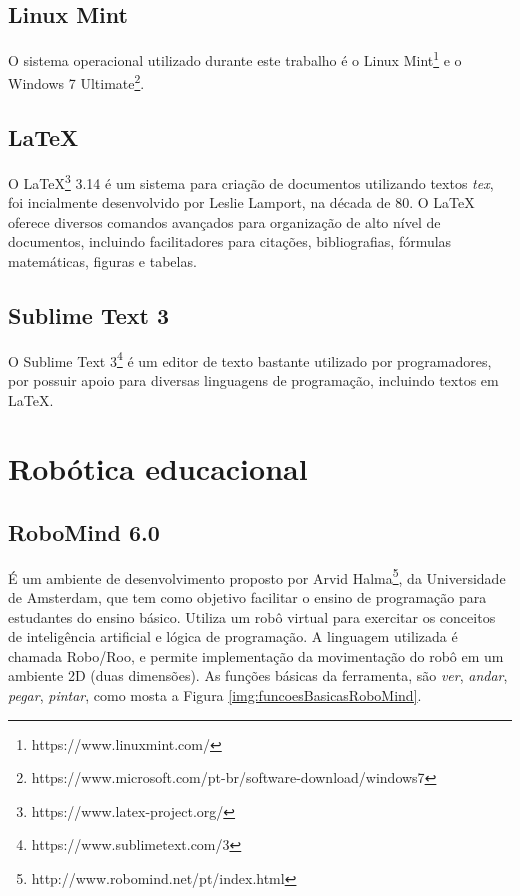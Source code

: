 	\subsection{Linux Mint} %
	\label{sub:linux_mint}
		O sistema operacional utilizado durante este trabalho é o Linux Mint\footnote{https://www.linuxmint.com/} e o Windows 7 Ultimate\footnote{https://www.microsoft.com/pt-br/software-download/windows7}.

	\subsection{LaTeX} %
	\label{sub:latex}
	
	O LaTeX\footnote{https://www.latex-project.org/} 3.14 é um sistema para criação de documentos utilizando textos \textit{tex}, foi incialmente desenvolvido por Leslie Lamport, na década de 80. O LaTeX oferece diversos comandos avançados para organização de alto nível de documentos, incluindo facilitadores para citações, bibliografias, fórmulas matemáticas, figuras e tabelas.

	\subsection{Sublime Text 3} %
	\label{sub:sublime_text_3}
		O Sublime Text 3\footnote{https://www.sublimetext.com/3} é um editor de texto bastante utilizado por programadores, por possuir apoio para diversas linguagens de programação, incluindo textos em LaTeX.

\section{Robótica educacional} %
\label{sec:robótica_educacional_suporte}

	\subsection{RoboMind 6.0} %
	\label{sub:robomind}

		É um ambiente de desenvolvimento proposto por Arvid Halma\footnote{http://www.robomind.net/pt/index.html}, da Universidade de Amsterdam, que tem como objetivo facilitar o ensino de programação para estudantes do ensino básico. Utiliza um robô virtual para exercitar os conceitos de inteligência artificial e lógica de programação. A linguagem utilizada é chamada Robo/Roo, e permite implementação da movimentação do robô em um ambiente 2D (duas dimensões). As funções básicas da ferramenta, são \textit{ver}, \textit{andar}, \textit{pegar}, \textit{pintar}, como mosta a Figura \ref{img:funcoesBasicasRoboMind}.

